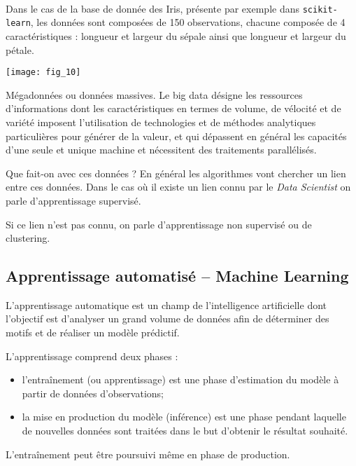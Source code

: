 \begin{exemple}~\\

\begin{minipage}[c]{.65\linewidth}
Dans le cas de la base de donnée des Iris, présente par exemple dans \texttt{scikit-learn}, les données sont composées de 150 observations, chacune composée de 4 caractéristiques : longueur et largeur du sépale ainsi que longueur et largeur du pétale.
\end{minipage} \hfill
\begin{minipage}[c]{.3\linewidth}
\begin{center}
\texttt{[image: fig\_10]}
\end{center}
\end{minipage} 

\end{exemple}


\begin{defi}
Mégadonnées ou données massives. Le big data désigne les ressources d’informations dont les caractéristiques en termes de volume, de vélocité et de variété imposent l’utilisation de technologies et de méthodes analytiques particulières pour générer de la valeur, et qui dépassent en général les capacités d'une seule et unique machine et nécessitent des traitements parallélisés.
\end{defi}




Que fait-on avec ces données ? En général les algorithmes vont chercher un lien entre ces données. Dans le cas où il existe un lien connu par le \textit{Data Scientist} on parle d'apprentissage supervisé. 

Si ce lien n'est pas connu, on parle d'apprentissage non supervisé ou de clustering. 


\subsection{Apprentissage automatisé -- Machine Learning}



\begin{defi}
L'apprentissage automatique est un champ de l'intelligence artificielle dont l'objectif est d'analyser un grand volume de
données afin de déterminer des motifs et de réaliser un modèle prédictif. 

L'apprentissage comprend deux phases : 
\begin{itemize}
\item l’entraînement (ou apprentissage) est une phase d'estimation du modèle à partir de données d'observations; 
\item la mise en production du modèle (inférence) est une phase pendant laquelle de nouvelles données sont traitées dans le but d'obtenir le résultat souhaité. 
\end{itemize}

L’entraînement peut être poursuivi même en phase de production.

\end{defi}


